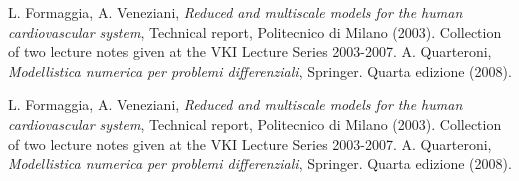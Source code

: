 \begin{thebibliography}{9}
    L. Formaggia, A. Veneziani, \emph{Reduced and multiscale models for the human cardiovascular system},
    Technical report, Politecnico di Milano (2003).
    Collection of two lecture notes given at the VKI Lecture Series 2003-2007.
    A. Quarteroni, \emph{Modellistica numerica per problemi differenziali},
    Springer. Quarta edizione (2008).
\end{thebibliography}

\begin{thebibliography}{For.Ven. 2003}
    	L. Formaggia, A. Veneziani, \emph{Reduced and multiscale models for the human cardiovascular system},
        Technical report, Politecnico di Milano (2003).
        Collection of two lecture notes given at the VKI Lecture Series 2003-2007.
    	A. Quarteroni, \emph{Modellistica numerica per problemi differenziali},
        Springer. Quarta edizione (2008).
\end{thebibliography}
